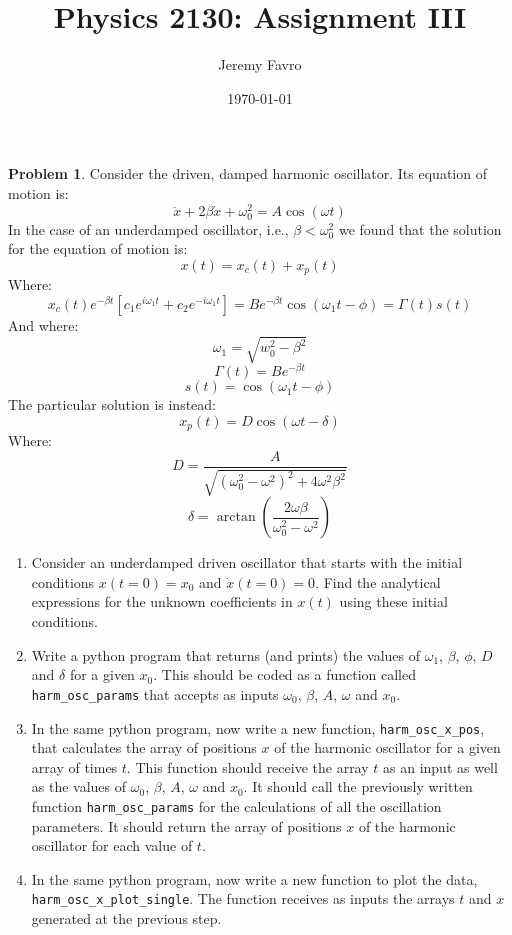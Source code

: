 \documentclass[10pt]{article}
\title{Physics 2130: Assignment III}
\author{Jeremy Favro}
\date{\today}
\theoremstyle{definition}
\newtheorem{problem}{Problem}
\begin{document}
\maketitle

\begin{problem}
Consider the driven, damped harmonic oscillator. Its equation of motion is:
$$\ddot{x}+2\beta\dot{x}+\omega_0^2=A\cos\left(\omega t\right)$$
In the case of an underdamped oscillator, i.e., $\beta<\omega_0^2$ we found that the solution for the equation of motion is:
$$x(t)=x_c(t)+x_p(t)$$
Where:
$$x_c(t)e^{-\beta t}\left[c_1e^{i\omega_1 t}+c_2e^{-i\omega_1 t}\right]=Be^{-\beta t}\cos\left(\omega_1 t-\phi\right)=\Gamma(t)s(t)$$
And where:
$$\omega_1=\sqrt{w_0^2-\beta^2}$$
$$\Gamma(t)=Be^{-\beta t}$$
$$s(t)=\cos\left(\omega_1 t-\phi\right)$$
The particular solution is instead:
$$x_p(t)=D\cos\left(\omega t-\delta\right)$$
Where:
$$D=\frac{A}{\sqrt{\left(\omega_0^2-\omega^2\right)^2+4\omega^2\beta^2}}$$
$$\delta=\arctan\left(\frac{2\omega\beta}{\omega_0^2-\omega^2}\right)$$
\begin{enumerate}[label=(\alph*)]
      \item Consider an underdamped driven oscillator that starts with the initial conditions $x(t=0)=x_0$ and $\dot{x}(t=0)=0$.
            Find the analytical expressions for the unknown coefficients in $x(t)$ using these initial conditions.

      \item Write a python program that returns (and prints) the values of $\omega_1$, $\beta$, $\phi$, $D$ and $\delta$ for a given $x_0$. This should
            be coded as a function called \verb|harm_osc_params| that accepts as inputs $\omega_0$, $\beta$, $A$, $\omega$ and $x_0$.

      \item In the same python program, now write a new function, \verb|harm_osc_x_pos|, that calculates the array of positions $x$ of the
            harmonic oscillator for a given array of times $t$. This function should receive the array $t$ as an input as well as the values of $\omega_0$,
            $\beta$, $A$, $\omega$ and $x_0$. It should call the previously written function \verb|harm_osc_params| for the calculations of all the oscillation parameters.
            It should return the array of positions $x$ of the harmonic oscillator for each value of $t$.

      \item In the same python program, now write a new function to plot the data, \verb|harm_osc_x_plot_single|. The
            function receives as inputs the arrays $t$ and $x$ generated at the previous step.


\end{enumerate}
\end{problem}
\end{document}
